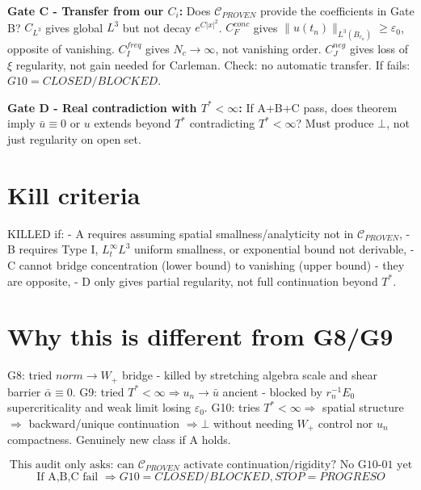 \documentclass[11pt]{article}
\begin{document}
\textbf{Gate C - Transfer from our $C_i$:}
Does $\mathcal C_{PROVEN}$ provide the coefficients in Gate B?
$C_{L^3}$ gives global $L^3$ but not decay $e^{C|x|^2}$.
$C_F^{conc}$ gives $\|u(t_n)\|_{L^3(B_{r_n})}\ge\varepsilon_0$, opposite of vanishing.
$C_I^{freq}$ gives $N_c\to\infty$, not vanishing order.
$C_J^{neg}$ gives loss of $\xi$ regularity, not gain needed for Carleman.
Check: no automatic transfer. If fails: $\boxed{G10=CLOSED/BLOCKED}$.

\textbf{Gate D - Real contradiction with $T^*<\infty$:}
If A+B+C pass, does theorem imply $\bar u\equiv0$ or $u$ extends beyond $T^*$ contradicting $T^*<\infty$?
Must produce $\bot$, not just regularity on open set.

\section{Kill criteria}
KILLED if:
- A requires assuming spatial smallness/analyticity not in $\mathcal C_{PROVEN}$,
- B requires Type I, $L^\infty_tL^3$ uniform smallness, or exponential bound not derivable,
- C cannot bridge concentration (lower bound) to vanishing (upper bound) - they are opposite,
- D only gives partial regularity, not full continuation beyond $T^*$.

\section{Why this is different from G8/G9}
G8: tried $norm\to W_+$ bridge - killed by stretching algebra scale and shear barrier $\bar\alpha\equiv0$.
G9: tried $T^*<\infty\Rightarrow u_n\to\bar u$ ancient - blocked by $r_n^{-1}E_0$ supercriticality and weak limit losing $\varepsilon_0$.
G10: tries $T^*<\infty\Rightarrow$ spatial structure $\Rightarrow$ backward/unique continuation $\Rightarrow\bot$ without needing $W_+$ control nor $u_n$ compactness. Genuinely new class if A holds.

\[
\boxed{\text{This audit only asks: can }\mathcal C_{PROVEN}\text{ activate continuation/rigidity? No G10-01 yet}}
\]
\[
\boxed{\text{If A,B,C fail }\Rightarrow G10=CLOSED/BLOCKED, STOP=PROGRESO}
\]
\end{document}
